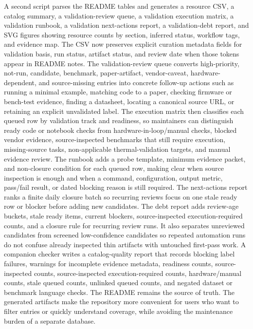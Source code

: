 \documentclass[11pt]{article}
\begin{document}
A second script parses the README tables and generates a resource CSV, a catalog summary, a validation-review queue, a validation execution matrix, a validation runbook, a validation next-actions report, a validation-debt report, and SVG figures showing resource counts by section, inferred status, workflow tags, and evidence map. The CSV now preserves explicit curation metadata fields for validation basis, run status, artifact status, and review date when those tokens appear in README notes. The validation-review queue converts high-priority, not-run, candidate, benchmark, paper-artifact, vendor-caveat, hardware-dependent, and source-missing entries into concrete follow-up actions such as running a minimal example, matching code to a paper, checking firmware or bench-test evidence, finding a datasheet, locating a canonical source URL, or retaining an explicit unvalidated label. The execution matrix then classifies each queued row by validation track and readiness, so maintainers can distinguish ready code or notebook checks from hardware-in-loop/manual checks, blocked vendor evidence, source-inspected benchmarks that still require execution, missing-source tasks, non-applicable thermal-validation targets, and manual evidence review. The runbook adds a probe template, minimum evidence packet, and non-closure condition for each queued row, making clear when source inspection is enough and when a command, configuration, output metric, pass/fail result, or dated blocking reason is still required. The next-actions report ranks a finite daily closure batch so recurring reviews focus on one stale ready row or blocker before adding new candidates. The debt report adds review-age buckets, stale ready items, current blockers, source-inspected execution-required counts, and a closure rule for recurring review runs. It also separates unreviewed candidates from screened low-confidence candidates so repeated automation runs do not confuse already inspected thin artifacts with untouched first-pass work. A companion checker writes a catalog-quality report that records blocking label failures, warnings for incomplete evidence metadata, readiness counts, source-inspected counts, source-inspected execution-required counts, hardware/manual counts, stale queued counts, unlinked queued counts, and negated dataset or benchmark language checks. The README remains the source of truth. The generated artifacts make the repository more convenient for users who want to filter entries or quickly understand coverage, while avoiding the maintenance burden of a separate database.
\end{document}
